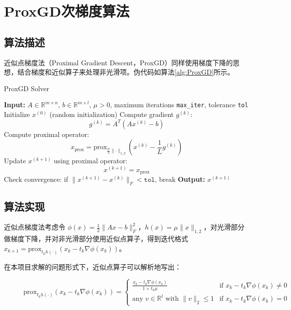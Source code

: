 \documentclass[journal, a4paper]{IEEEtran}
\begin{document}
\section{\textbf{ProxGD次梯度算法}}

\subsection{\textbf{算法描述}}

近似点梯度法（Proximal Gradient Descent，ProxGD）同样使用梯度下降的思想，结合梯度和近似算子来处理非光滑项。伪代码如算法\ref{alg:ProxGD}所示。

\begin{algorithm}
    \caption{ProxGD Solver}
    \label{alg:ProxGD}
    \begin{algorithmic}[1]
    \State \textbf{Input:} $A \in \mathbb{R}^{m \times n}$, $b \in \mathbb{R}^{m \times l}$, $\mu > 0$, maximum iterations \texttt{max\_iter}, tolerance \texttt{tol}
    \State Initialize $x^{(0)}$ (random initialization)
        \State Compute gradient $g^{(k)}$:
        \[
        g^{(k)} = A^T(Ax^{(k)} - b)
        \]
        \State Compute proximal operator:
        \[
        x_{\text{prox}} = \text{prox}_{\frac{\mu}{L}\lVert \cdot \rVert_{1,2}}\left(x^{(k)} - \frac{1}{L} g^{(k)}\right)
        \]
        \State Update $x^{(k+1)}$ using proximal operator:
        \[
        x^{(k+1)} = x_{\text{prox}}
        \]
        \State Check convergence: if $\lVert x^{(k+1)} - x^{(k)} \rVert_F < \texttt{tol}$, break
    \EndFor
    \State \textbf{Output:} $x^{(k+1)}$
    \end{algorithmic}
\end{algorithm}

\subsection{\textbf{算法实现}}

近似点梯度法考虑令 $\phi(x)=\frac{1}{2}\|Ax-b\|_F^2$，$h(x)=\mu\|x\|_{1,2}$，对光滑部分做梯度下降，并对非光滑部分使用近似点算子，得到迭代格式 $x_{k+1}=\text{prox}_{t_{k}h(\cdot)}(x_k-t_k\nabla\phi(x_k))$。

在本项目求解的问题形式下，近似点算子可以解析地写出：
\begin{figure}
    \begin{equation}\label{eq:prox}
        \text{prox}_{t_{k}h(\cdot)}(x_k-t_k\nabla\phi(x_k)) = \begin{cases}
            \frac{x_k-t_k\nabla\phi(x_k)}{1+t_k\mu} & \text{if } x_k-t_k\nabla\phi(x_k) \neq 0 \\
            \text{any } v \in \mathbb{R}^l \text{ with } \lVert v \rVert_2 \leq 1 & \text{if } x_k-t_k\nabla\phi(x_k) = 0
        \end{cases}
    \end{equation}
\end{figure}
\end{document}
